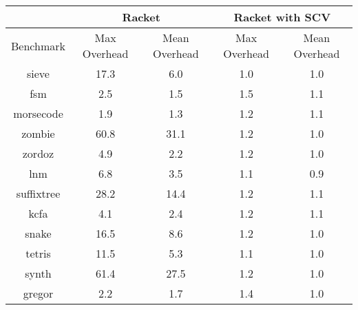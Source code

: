 \begin{tabular}{ | c | c c | c c | }
\hline
& \multicolumn{2}{|c|}{Racket}
& \multicolumn{2}{|c|}{Racket with SCV} \\
\hline
Benchmark
& Max Overhead & Mean Overhead
& Max Overhead & Mean Overhead \\
\hline
sieve & \cellcolor{rktpink} 17.3 & \cellcolor{rktpink} 6.0 & \cellcolor{rktpalegreen} 1.0 & \cellcolor{rktpalegreen} 1.0\\fsm & 2.5 & 1.5 & 1.5 & \cellcolor{rktpalegreen} 1.1\\morsecode & 1.9 & 1.3 & \cellcolor{rktpalegreen} 1.2 & \cellcolor{rktpalegreen} 1.1\\zombie & \cellcolor{rktpink} 60.8 & \cellcolor{rktpink} 31.1 & \cellcolor{rktpalegreen} 1.2 & \cellcolor{rktpalegreen} 1.0\\zordoz & \cellcolor{rktpink} 4.9 & 2.2 & \cellcolor{rktpalegreen} 1.2 & \cellcolor{rktpalegreen} 1.0\\lnm & \cellcolor{rktpink} 6.8 & \cellcolor{rktpink} 3.5 & \cellcolor{rktpalegreen} 1.1 & \cellcolor{rktpalegreen} 0.9\\suffixtree & \cellcolor{rktpink} 28.2 & \cellcolor{rktpink} 14.4 & \cellcolor{rktpalegreen} 1.2 & \cellcolor{rktpalegreen} 1.1\\kcfa & \cellcolor{rktpink} 4.1 & 2.4 & \cellcolor{rktpalegreen} 1.2 & \cellcolor{rktpalegreen} 1.1\\snake & \cellcolor{rktpink} 16.5 & \cellcolor{rktpink} 8.6 & \cellcolor{rktpalegreen} 1.2 & \cellcolor{rktpalegreen} 1.0\\tetris & \cellcolor{rktpink} 11.5 & \cellcolor{rktpink} 5.3 & \cellcolor{rktpalegreen} 1.1 & \cellcolor{rktpalegreen} 1.0\\synth & \cellcolor{rktpink} 61.4 & \cellcolor{rktpink} 27.5 & \cellcolor{rktpalegreen} 1.2 & \cellcolor{rktpalegreen} 1.0\\gregor & 2.2 & 1.7 & 1.4 & \cellcolor{rktpalegreen} 1.0 \\
\hline
\end{tabular}
